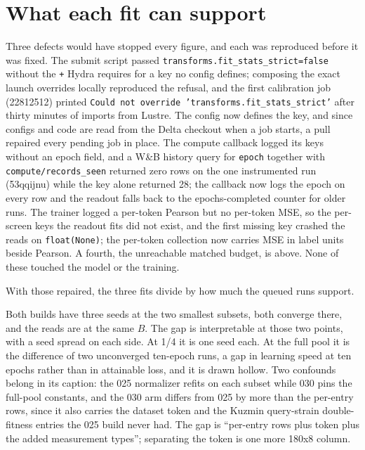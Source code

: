 
\section{What each fit can support}
\label{sec:support}

Three defects would have stopped every figure, and each was reproduced before it
was fixed. The submit script passed \texttt{transforms.fit\_stats\_strict=false}
without the \texttt{+} Hydra requires for a key no config defines; composing the
exact launch overrides locally reproduced the refusal, and the first calibration
job (22812512) printed \texttt{Could not override 'transforms.fit\_stats\_strict'}
after thirty minutes of imports from Lustre. The config now defines the key, and
since configs and code are read from the Delta checkout when a job starts, a
pull repaired every pending job in place. The compute callback logged its keys
without an epoch field, and a W\&B history query for \texttt{epoch} together with
\texttt{compute/records\_seen} returned zero rows on the one instrumented run
(53qqijnu) while the key alone returned 28; the callback now logs the epoch on
every row and the readout falls back to the epochs-completed counter for older
runs. The trainer logged a per-token Pearson but no per-token MSE, so the
per-screen keys the readout fits did not exist, and the first missing key
crashed the reads on \texttt{float(None)}; the per-token collection now carries
MSE in label units beside Pearson. A fourth, the unreachable matched budget, is
above. None of these touched the model or the training.

With those repaired, the three fits divide by how much the queued runs support.

Both builds have three seeds at the two smallest subsets, both converge there,
and the reads are at the same $B$. The gap is interpretable at those two points,
with a seed spread on each side. At 1/4 it is one seed each. At the full pool it
is the difference of two unconverged ten-epoch runs, a gap in learning speed at
ten epochs rather than in attainable loss, and it is drawn hollow. Two confounds
belong in its caption: the 025 normalizer refits on each subset while 030 pins
the full-pool constants, and the 030 arm differs from 025 by more than the
per-entry rows, since it also carries the dataset token and the Kuzmin
query-strain double-fitness entries the 025 build never had. The gap is
``per-entry rows plus token plus the added measurement types''; separating the
token is one more 180x8 column.

